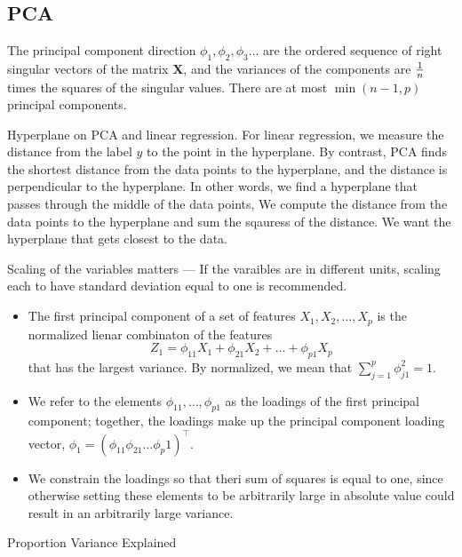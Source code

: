 \documentclass[11pt, a4paper]{article}
\begin{document}
\subsection{PCA}
The principal component direction $\phi_1,\phi_2,\phi_3\dots$ are the ordered sequence of right singular vectors of the matrix $\mathbf{X}$, and the variances of the components are ${1\over n} $ times the squares of the singular values. There are at most $\min(n-1,p)$ principal components.\par
Hyperplane on PCA and linear regression. For linear regression, we measure the distance from the label $y$ to the point in the hyperplane. By contrast, PCA finds the shortest distance from the data points to the hyperplane, and the distance is perpendicular to the hyperplane. In other words, we find a hyperplane that passes through the middle of the data points, We compute the distance from the data points to the hyperplane and sum the sqauress of the distance. We want the hyperplane that gets closest to the data.\par
Scaling of the variables matters --- If the varaibles are in different units, scaling each to have standard deviation equal to one is recommended.\\
\begin{itemize}
  \item The first principal component of a set of features $X_1,X_2,\dots,X_p$ is the normalized lienar combinaton of the features 
\[
  Z_1=\phi_{11}X_1+\phi_{21}X_2+\dots+\phi_{p1}X_p    
\]
that has the largest variance. By normalized, we mean that $\sum_{j=1}^p\phi_{j1}^2=1$.
\item We refer to the elements $\phi_{11},\dots,\phi_{p1}$ as the loadings of the first principal component; together, the loadings make up the principal component loading vector, $\phi_1=(\phi_{11} \phi_{21} \dots \phi_p1)^\top$.
\item We constrain the loadings so that theri sum of squares is equal to one, since otherwise setting these elements to be arbitrarily large in absolute value could result in an arbitrarily large variance.
  \end{itemize}
Proportion Variance Explained
\end{document}
